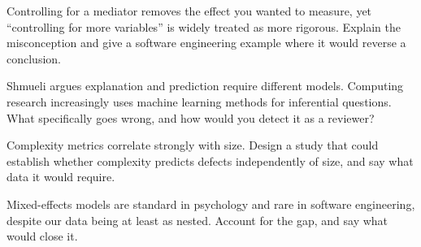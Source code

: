 \begin{reviewq}
  \item Controlling for a mediator removes the effect you wanted to measure,
    yet ``controlling for more variables'' is widely treated as more rigorous.
    Explain the misconception and give a software engineering example where it
    would reverse a conclusion.
  \item Shmueli argues explanation and prediction require different models.
    Computing research increasingly uses machine learning methods for
    inferential questions. What specifically goes wrong, and how would you
    detect it as a reviewer?
  \item Complexity metrics correlate strongly with size. Design a study that
    could establish whether complexity predicts defects independently of size,
    and say what data it would require.
  \item Mixed-effects models are standard in psychology and rare in software
    engineering, despite our data being at least as nested. Account for the
    gap, and say what would close it.
\end{reviewq}
